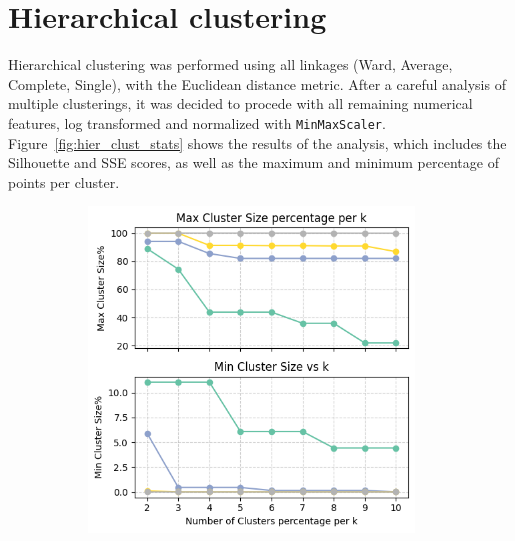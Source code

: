 \section{Hierarchical clustering}\label{sec:hierarchical}
Hierarchical clustering was performed using all linkages (Ward, Average, Complete, Single), with the Euclidean
distance metric. After a careful analysis of multiple clusterings, it was decided to procede with
all remaining numerical features, log transformed and normalized with \texttt{MinMaxScaler}.
Figure~\ref{fig:hier_clust_stats} shows the results of the analysis, which includes the Silhouette and SSE
scores, as well as the maximum and minimum percentage of points per cluster.
\begin{figure}[H]
    \centering
    \begin{subfigure}[t]{0.49\textwidth}
        \centering
        \includegraphics[width=0.95\textwidth]{plots/max_min_pctg.png}
        \label{fig:max_min_pctg}
    \end{subfigure}
    \hfill
    \begin{subfigure}[t]{0.49\textwidth}
        \centering

\end{subfigure}
\end{figure}

